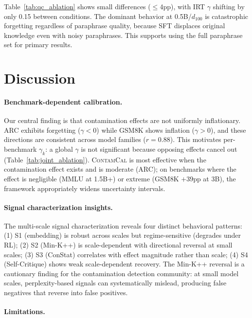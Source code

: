 \documentclass[11pt,a4paper]{article}
\newcommand{\contamcal}{\textsc{ContamCal}}
\begin{document}
Table~\ref{tab:qc_ablation} shows small differences ($\leq$4pp), with IRT $\gamma$ shifting by only 0.15 between conditions. The dominant behavior at 0.5B/$d_{100}$ is catastrophic forgetting regardless of paraphrase quality, because SFT displaces original knowledge even with noisy paraphrases. This supports using the full paraphrase set for primary results.

\section{Discussion}
\label{sec:discussion}

\paragraph{Benchmark-dependent calibration.}
Our central finding is that contamination effects are not uniformly inflationary. ARC exhibits forgetting ($\gamma<0$) while GSM8K shows inflation ($\gamma>0$), and these directions are consistent across model families ($r=0.88$). This motivates per-benchmark $\gamma_k$: a global $\gamma$ is not significant because opposing effects cancel out (Table~\ref{tab:joint_ablation}). \contamcal{} is most effective when the contamination effect exists and is moderate (ARC); on benchmarks where the effect is negligible (MMLU at 1.5B+) or extreme (GSM8K $+39$pp at 3B), the framework appropriately widens uncertainty intervals.

\paragraph{Signal characterization insights.}
The multi-scale signal characterization reveals four distinct behavioral patterns: (1) S1 (embedding) is robust across scales but regime-sensitive (degrades under RL); (2) S2 (Min-K++) is scale-dependent with directional reversal at small scales; (3) S3 (ConStat) correlates with effect magnitude rather than scale; (4) S4 (Self-Critique) shows weak scale-dependent recovery. The Min-K++ reversal is a cautionary finding for the contamination detection community: at small model scales, perplexity-based signals can systematically mislead, producing false negatives that reverse into false positives.

\paragraph{Limitations.}
\end{document}
